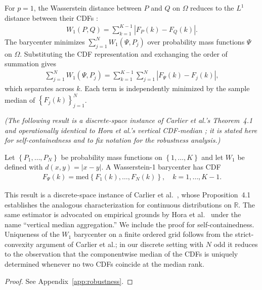 For $p=1$, the Wasserstein distance between $P$ and $Q$ on $\Omega$ reduces to the $L^1$ distance between their CDFs \cite{vallender73,panaretos19}:
\begin{align*}
W_1(P,Q)=\sum_{k=1}^{K-1}\left|F_P(k)-F_Q(k)\right|.
\end{align*}
The barycenter minimizes $\sum_{j=1}^N W_1(\Psi,P_j)$ over probability mass functions $\Psi$ on $\Omega$.  Substituting the CDF representation and exchanging the order of summation gives
\begin{align*}
\sum_{j=1}^N W_1(\Psi,P_j)=\sum_{k=1}^{K-1}\sum_{j=1}^N\left|F_\Psi(k)-F_j(k)\right|,
\end{align*}
which separates across $k$.  Each term is independently minimized by the sample median of $\left\{F_j(k)\right\}_{j=1}^N$.

\begin{proposition}
\label{prop:w1}
\textit{(The following result is a discrete-space instance of Carlier et al.'s Theorem~4.1 \cite{carlier23} and operationally identical to Hora et al.'s vertical CDF-median \cite{hora13}; it is stated here for self-containedness and to fix notation for the robustness analysis.)}

Let $\left\{P_1,\ldots,P_N\right\}$ be probability mass functions on $\left\{1,\ldots,K\right\}$ and let $W_1$ be defined with $d(x,y)=|x-y|$.  A Wasserstein-1 barycenter has CDF
\begin{align*}
F_\Psi(k)=\mathrm{med}\left\{F_1(k),\ldots,F_N(k)\right\},\quad k=1,\ldots,K-1.
\end{align*}
\end{proposition}
\begin{remark}
This result is a discrete-space instance of Carlier et al.\ \cite{carlier23}, whose Proposition~4.1 establishes the analogous characterization for continuous distributions on $\mathbb{R}$.  The same estimator is advocated on empirical grounds by Hora et al.\ \cite{hora13} under the name ``vertical median aggregation.''  We include the proof for self-containedness.  Uniqueness of the $W_1$ barycenter on a finite ordered grid follows from the strict-convexity argument of Carlier et al.; in our discrete setting with $N$ odd it reduces to the observation that the componentwise median of the CDFs is uniquely determined whenever no two CDFs coincide at the median rank.
\end{remark}
\begin{proof}
See Appendix~\ref{app:robustness}.
\end{proof}

